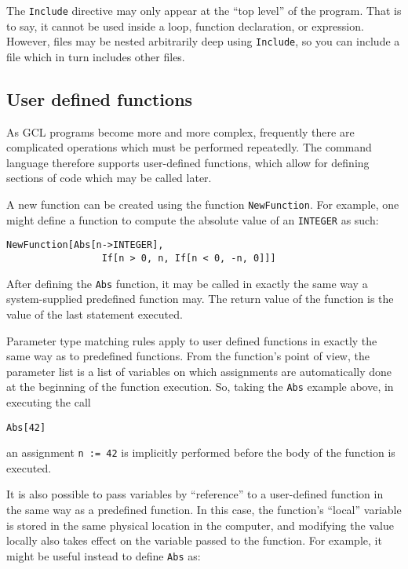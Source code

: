 The {\tt Include} directive may only appear at the ``top level'' of the
program.  That is to say, it cannot be used inside a loop, function declaration, or expression.  However, files may be nested arbitrarily deep using
{\tt Include}, so you can include a file which in turn includes other files.
  
\subsection{User defined functions}

As GCL programs become more and more complex, frequently there are complicated
operations which must be performed repeatedly.  The command language therefore
supports user-defined functions, which allow for defining sections of code
which may be called later.

A new function can be created using the function
\verb+NewFunction+.  For example, one might define a function to compute
the absolute value of an {\tt INTEGER} as such:

\begin{verbatim}
NewFunction[Abs[n->INTEGER],
                 If[n > 0, n, If[n < 0, -n, 0]]]
\end{verbatim}

\noindent After defining the \verb+Abs+ function, it may be called in exactly
the same way a system-supplied predefined function may.  The return value
of the function is the value of the last statement executed. 

Parameter type matching rules apply to user defined functions in exactly the
same way as to predefined functions.  From the function's point of view,
the parameter list is a list of variables on which assignments are
automatically done at the beginning of the function execution.  So, taking
the \verb+Abs+ example above, in executing the call

\begin{verbatim}
Abs[42]
\end{verbatim}

\noindent an assignment \verb+n := 42+ is implicitly performed before the
body of the function is executed.

It is also possible to pass variables by ``reference'' to a user-defined
function in the same way as a predefined function.  In this case, the
function's ``local'' variable is stored in the same physical location in the
computer, and modifying the value locally also takes effect on the variable
passed to the function.  For example, it might
be useful instead to define \verb+Abs+ as:

